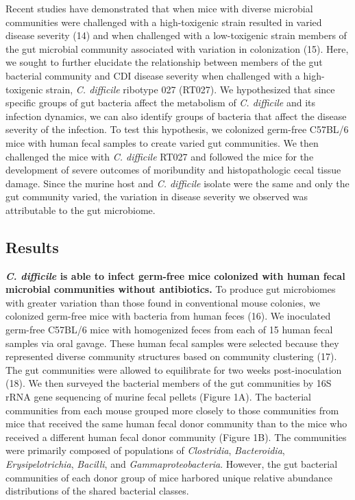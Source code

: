 \documentclass[
  12pt,
]{article}
\begin{document}
Recent studies have demonstrated that when mice with diverse microbial
communities were challenged with a high-toxigenic strain resulted in
varied disease severity (14) and when challenged with a low-toxigenic
strain members of the gut microbial community associated with variation
in colonization (15). Here, we sought to further elucidate the
relationship between members of the gut bacterial community and CDI
disease severity when challenged with a high-toxigenic strain, \emph{C.
difficile} ribotype 027 (RT027). We hypothesized that since specific
groups of gut bacteria affect the metabolism of \emph{C. difficile} and
its infection dynamics, we can also identify groups of bacteria that
affect the disease severity of the infection. To test this hypothesis,
we colonized germ-free C57BL/6 mice with human fecal samples to create
varied gut communities. We then challenged the mice with \emph{C.
difficile} RT027 and followed the mice for the development of severe
outcomes of moribundity and histopathologic cecal tissue damage. Since
the murine host and \emph{C. difficile} isolate were the same and only
the gut community varied, the variation in disease severity we observed
was attributable to the gut microbiome.

\hypertarget{results}{%
\subsection{Results}\label{results}}

\textbf{\emph{C. difficile} is able to infect germ-free mice colonized
with human fecal microbial communities without antibiotics.} To produce
gut microbiomes with greater variation than those found in conventional
mouse colonies, we colonized germ-free mice with bacteria from human
feces (16). We inoculated germ-free C57BL/6 mice with homogenized feces
from each of 15 human fecal samples via oral gavage. These human fecal
samples were selected because they represented diverse community
structures based on community clustering (17). The gut communities were
allowed to equilibrate for two weeks post-inoculation (18). We then
surveyed the bacterial members of the gut communities by 16S rRNA gene
sequencing of murine fecal pellets (Figure 1A). The bacterial
communities from each mouse grouped more closely to those communities
from mice that received the same human fecal donor community than to the
mice who received a different human fecal donor community (Figure 1B).
The communities were primarily composed of populations of
\emph{Clostridia}, \emph{Bacteroidia}, \emph{Erysipelotrichia},
\emph{Bacilli}, and \emph{Gammaproteobacteria}. However, the gut
bacterial communities of each donor group of mice harbored unique
relative abundance distributions of the shared bacterial classes.
\end{document}
